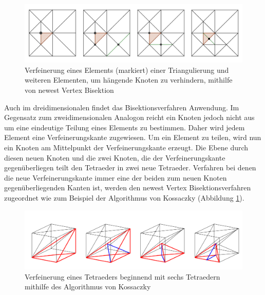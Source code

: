 \begin{figure}[!htbp]
	\begin{center}
		\includegraphics[width=16cm]{pics/bisec2.png}
	\end{center}
	\caption{Verfeinerung eines Elements (markiert) einer Triangulierung und weiteren Elementen, um hängende Knoten zu verhindern, mithilfe von newest Vertex Bisektion}
\end{figure}

Auch im dreidimensionalen findet das Bisektionsverfahren Anwendung. Im Gegensatz zum zweidimensionalen Analogon reicht ein Knoten jedoch nicht aus um eine eindeutige Teilung eines Elements zu bestimmen. Daher wird jedem Element eine Verfeinerungskante zugewiesen. Um ein Element zu teilen, wird nun ein Knoten am Mittelpunkt der Verfeinerungskante erzeugt. Die Ebene durch diesen neuen Knoten und die zwei Knoten, die der Verfeinerungskante gegenüberliegen teilt den Tetraeder in zwei neue Tetraeder. Verfahren bei denen die neue Verfeinerungskante immer eine der beiden zum neuen Knoten gegenüberliegenden Kanten ist, werden den newest Vertex Bisektionsverfahren zugeordnet wie zum Beispiel der Algorithmus von Kossaczky (Abbildung \ref{kos}).

\begin{figure}[!htbp]
\begin{center}
	\includegraphics[width=16cm]{pics/bisec3.png}
\end{center}
\caption{\label{kos}Verfeinerung eines Tetraeders beginnend mit sechs Tetraedern mithilfe des Algorithmus von Kossaczky}
\end{figure}